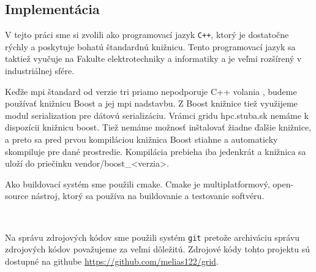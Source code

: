 \subsection{Implementácia}
V tejto práci sme si zvolili ako programovací jazyk \texttt{C++}, ktorý je dostatočne rýchly a poskytuje bohatú štandardnú knižnicu.
Tento programovací jazyk sa taktiež vyučuje na Fakulte elektrotechniky a informatiky a je veľmi rozšírený v industriálnej sfére.

Keďže \acrshort{mpi} štandard od verzie tri priamo nepodporuje C++ volania \cite{mpi3-1},
budeme používať knižnicu Boost a jej \acrshort{mpi} nadstavbu. Z Boost knižnice tiež využijeme modul serialization pre dátovú serializáciu.
Vrámci gridu hpc.stuba.sk nemáme k dispozícii knižnicu boost. Tiež nemáme možnosť inštalovať žiadne ďalšie knižnice,
a preto sa pred prvou kompiláciou knižnica Boost stiahne a automaticky skompiluje pre dané prostredie.
Kompilácia prebieha iba jedenkrát a knižnica sa uloží do priečinku vendor/boost\_<verzia>.

Ako buildovací systém sme použili cmake.
Cmake je multiplatformový, open-source nástroj, ktorý sa používa na buildovanie a testovanie softvéru.
\begin{lstlisting}
  
\end{lstlisting}

Na správu zdrojových kódov sme použili systém \texttt{git} pretože archiváciu správu zdrojových kódov považujeme za veľmi dôležitú.
Zdrojové kódy tohto projektu sú dostupné na githube \url{https://github.com/melias122/grid}.

